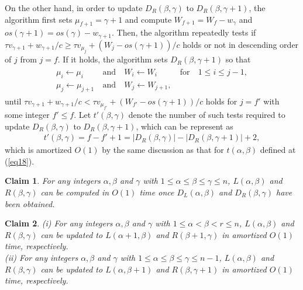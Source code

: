 \documentclass[a4paper]{llncs}
\newtheorem{clm}{Claim}
\begin{document}
On the other hand, in order to update $D_R(\beta, \gamma)$ to $D_R(\beta, \gamma+1)$, the algorithm first sets $\mu_{f+1} = \gamma+1$ and 
compute $W_{f+1} = W_f - w_\gamma$ and $os(\gamma+1) = os(\gamma) - w_{\gamma+1}$.
Then, the algorithm repeatedly tests if 
$\tau v_{\gamma+1} + w_{\gamma+1}/c \ge \tau v_{\mu_j} + (W_j - os(\gamma+1))/c$ holds or not in descending order of $j$ from $j = f$.
If it holds, the algorithm sets $D_R(\beta, \gamma+1)$ so that
\begin{eqnarray}
    \begin{array}{lllll}
	\mu_i \leftarrow \mu_i \		& \mbox{and} \ & W_i \leftarrow W_i \					& \mbox{for} \ & 1 \le i \le j-1, \\
	\mu_{j} \leftarrow \mu_{j+1} \	& \mbox{and} \ & W_{j} \leftarrow W_{j+1}, \	& 	
    \end{array}
    \label{eq23}
\end{eqnarray}
until $\tau v_{\gamma+1} + w_{\gamma+1}/c < \tau v_{\mu_{f'}} + (W_{f'} - os(\gamma+1))/c$ holds for $j=f'$ with some integer $f' \le f$.
Let $t'(\beta, \gamma)$ denote the number of such tests required to update $D_R(\beta, \gamma)$ to $D_R(\beta, \gamma+1)$, which can be represent as
\begin{eqnarray}
t'(\beta, \gamma) = f - f' + 1 = |D_R(\beta, \gamma)| - |D_R(\beta, \gamma+1)| + 2,
\label{eq24}
\end{eqnarray}
which is amortized $O(1)$ by the same discussion as that for $t(\alpha, \beta)$ defined at (\ref{eq18}).

\begin{clm}
For any integers $\alpha, \beta$ and $\gamma$ with $1 \le \alpha \le \beta \le \gamma \le n$,
$L(\alpha, \beta)$ and $R(\beta, \gamma)$ can be computed in $O(1)$ time once $D_L(\alpha, \beta)$ and $D_R(\beta, \gamma)$ have been obtained.
\label{clm:ds1}
\end{clm}
\begin{clm}
{\rm (i)} For any integers $\alpha, \beta$ and $\gamma$ with $1 \le \alpha < \beta < r \le n$,
$L(\alpha, \beta)$ and $R(\beta, \gamma)$ can be updated to $L(\alpha+1, \beta)$ and $R(\beta+1, \gamma)$ in amortized $O(1)$ time, respectively. \\
{\rm (ii)} For any integers $\alpha, \beta$ and $\gamma$ with $1 \le \alpha \le \beta \le \gamma \le n-1$,
$L(\alpha, \beta)$ and $R(\beta, \gamma)$ can be updated to $L(\alpha, \beta+1)$ and $R(\beta, \gamma+1)$ in amortized $O(1)$ time, respectively.
\label{clm:ds2}
\end{clm}
\end{document}
